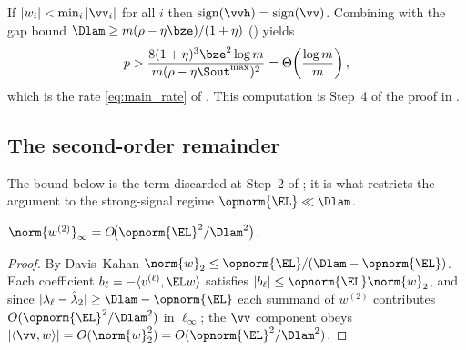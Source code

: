 \begin{corollary}\label{cor:C-cond}
If $|w_i|<\min_i|\vv_i|$ for all $i$ then
$\operatorname{sign}(\vvh)=\operatorname{sign}(\vv)$. Combining
 with the gap bound
$\Dlam\ge m(\rho-\eta\bze)/(1+\eta)$ () yields
\begin{equation}\label{eq:per-node-p}
   p>\frac{8(1+\eta)^3\bze^2\log m}{m(\rho-\eta\Sout^{\max})^2}
    =\Theta\!\left(\frac{\log m}{m}\right),
\end{equation}
which is the rate \eqref{eq:main_rate} of . This computation is
Step~4 of the proof in .
\end{corollary}

\subsection{The second-order remainder}\label{app:comp3c}

The bound below is the term discarded at Step~2 of ; it is
what restricts the argument to the strong-signal regime $\opnorm{\EL}\ll\Dlam$.

\begin{lemma}\label{lem:C-remainder}
$\norm{w^{(2)}}_\infty=O\!\bigl(\opnorm{\EL}^2/\Dlam^2\bigr)$.
\end{lemma}
\begin{proof}
By Davis--Kahan $\norm{w}_2\le\opnorm{\EL}/(\Dlam-\opnorm{\EL})$. Each coefficient
$b_\ell=-\langle v^{(\ell)},\EL w\rangle$ satisfies $|b_\ell|\le\opnorm{\EL}\norm{w}_2$,
and since $|\lambda_\ell-\hat\lambda_2|\ge\Dlam-\opnorm{\EL}$ each summand of
$w^{(2)}$ contributes $O(\opnorm{\EL}^2/\Dlam^2)$ in $\ell_\infty$; the $\vv$
component obeys $|\langle\vv,w\rangle|=O(\norm{w}_2^2)=O(\opnorm{\EL}^2/\Dlam^2)$.
\end{proof}
